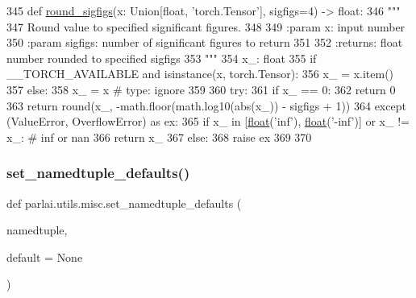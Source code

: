 \begin{DoxyCode}
345 \textcolor{keyword}{def }\hyperlink{namespaceparlai_1_1utils_1_1misc_a85b4447d47998393aaca2c83660f096e}{round\_sigfigs}(x: Union[float, \textcolor{stringliteral}{'torch.Tensor'}], sigfigs=4) -> float:
346     \textcolor{stringliteral}{"""}
347 \textcolor{stringliteral}{    Round value to specified significant figures.}
348 \textcolor{stringliteral}{}
349 \textcolor{stringliteral}{    :param x: input number}
350 \textcolor{stringliteral}{    :param sigfigs: number of significant figures to return}
351 \textcolor{stringliteral}{}
352 \textcolor{stringliteral}{    :returns: float number rounded to specified sigfigs}
353 \textcolor{stringliteral}{    """}
354     x\_: float
355     \textcolor{keywordflow}{if} \_\_TORCH\_AVAILABLE \textcolor{keywordflow}{and} isinstance(x, torch.Tensor):
356         x\_ = x.item()
357     \textcolor{keywordflow}{else}:
358         x\_ = x  \textcolor{comment}{# type: ignore}
359 
360     \textcolor{keywordflow}{try}:
361         \textcolor{keywordflow}{if} x\_ == 0:
362             \textcolor{keywordflow}{return} 0
363         \textcolor{keywordflow}{return} round(x\_, -math.floor(math.log10(abs(x\_)) - sigfigs + 1))
364     \textcolor{keywordflow}{except} (ValueError, OverflowError) \textcolor{keyword}{as} ex:
365         \textcolor{keywordflow}{if} x\_ \textcolor{keywordflow}{in} [\hyperlink{namespaceprojects_1_1controllable__dialogue_1_1make__control__dataset_aa2b7207688c641dbc094ab44eca27113}{float}(\textcolor{stringliteral}{'inf'}), \hyperlink{namespaceprojects_1_1controllable__dialogue_1_1make__control__dataset_aa2b7207688c641dbc094ab44eca27113}{float}(\textcolor{stringliteral}{'-inf'})] \textcolor{keywordflow}{or} x\_ != x\_:  \textcolor{comment}{# inf or nan}
366             \textcolor{keywordflow}{return} x\_
367         \textcolor{keywordflow}{else}:
368             \textcolor{keywordflow}{raise} ex
369 
370 
\end{DoxyCode}
\mbox{\label{namespaceparlai_1_1utils_1_1misc_a8781cc03272b3a118fcd9e5a9f4ca1dd}} 
\subsubsection{\texorpdfstring{set\+\_\+namedtuple\+\_\+defaults()}{set\_namedtuple\_defaults()}}
{\footnotesize\ttfamily def parlai.\+utils.\+misc.\+set\+\_\+namedtuple\+\_\+defaults (\begin{DoxyParamCaption}\item[{}]{namedtuple,  }\item[{}]{default = {\ttfamily None} }\end{DoxyParamCaption})}

